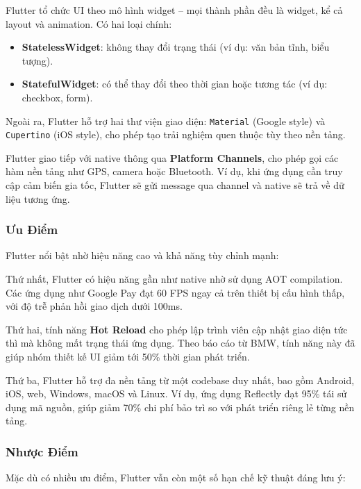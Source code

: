 Flutter tổ chức UI theo mô hình widget – mọi thành phần đều là widget, kể cả layout và animation.  
Có hai loại chính:
\begin{itemize}
    \item \textbf{StatelessWidget}: không thay đổi trạng thái (ví dụ: văn bản tĩnh, biểu tượng).
    \item \textbf{StatefulWidget}: có thể thay đổi theo thời gian hoặc tương tác (ví dụ: checkbox, form).
\end{itemize}

Ngoài ra, Flutter hỗ trợ hai thư viện giao diện: \texttt{Material} (Google style) và \texttt{Cupertino} (iOS style), cho phép tạo trải nghiệm quen thuộc tùy theo nền tảng.

Flutter giao tiếp với native thông qua \textbf{Platform Channels}, cho phép gọi các hàm nền tảng như GPS, camera hoặc Bluetooth.  
Ví dụ, khi ứng dụng cần truy cập cảm biến gia tốc, Flutter sẽ gửi message qua channel và native sẽ trả về dữ liệu tương ứng.

\subsubsection{Ưu Điểm}

\hspace*{1.5em}Flutter nổi bật nhờ hiệu năng cao và khả năng tùy chỉnh mạnh:

Thứ nhất, Flutter có hiệu năng gần như native nhờ sử dụng AOT compilation.  
Các ứng dụng như Google Pay đạt 60 FPS ngay cả trên thiết bị cấu hình thấp, với độ trễ phản hồi giao dịch dưới 100ms.

Thứ hai, tính năng \textbf{Hot Reload} cho phép lập trình viên cập nhật giao diện tức thì mà không mất trạng thái ứng dụng.  
Theo báo cáo từ BMW, tính năng này đã giúp nhóm thiết kế UI giảm tới 50\% thời gian phát triển.

Thứ ba, Flutter hỗ trợ đa nền tảng từ một codebase duy nhất, bao gồm Android, iOS, web, Windows, macOS và Linux.  
Ví dụ, ứng dụng Reflectly đạt 95\% tái sử dụng mã nguồn, giúp giảm 70\% chi phí bảo trì so với phát triển riêng lẻ từng nền tảng.

\subsubsection{Nhược Điểm}

\hspace*{1.5em}Mặc dù có nhiều ưu điểm, Flutter vẫn còn một số hạn chế kỹ thuật đáng lưu ý:

